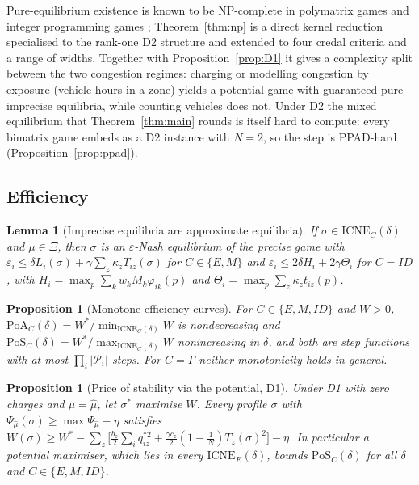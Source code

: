 \documentclass[preprint,12pt]{elsarticle}
\newtheorem{lemma}[theorem]{Lemma}
\newtheorem{proposition}[theorem]{Proposition}
\theoremstyle{definition}
\theoremstyle{remark}
\newcommand{\cP}{\mathcal{P}}
\newcommand{\ICNE}{\mathrm{ICNE}}
\begin{document}
Pure-equilibrium existence is known to be NP-complete in polymatrix games and integer programming games \citep{Apt2022,Carvalho2022}; Theorem~\ref{thm:np} is a direct kernel reduction specialised to the rank-one D2 structure and extended to four credal criteria and a range of widths. Together with Proposition~\ref{prop:D1} it gives a complexity split between the two congestion regimes: charging or modelling congestion by exposure (vehicle-hours in a zone) yields a potential game with guaranteed pure imprecise equilibria, while counting vehicles does not. Under D2 the mixed equilibrium that Theorem~\ref{thm:main} rounds is itself hard to compute: every bimatrix game embeds as a D2 instance with $N=2$, so the step is PPAD-hard \citep{Chen2009,Daskalakis2009} (Proposition~\ref{prop:ppad}).

\subsection{Efficiency}

\begin{lemma}[Imprecise equilibria are approximate equilibria]\label{lem:transfer}
If $\sigma\in\ICNE_C(\delta)$ and $\mu\in\Xi$, then $\sigma$ is an $\varepsilon$-Nash equilibrium of the precise game with $\varepsilon_i\le\delta L_i(\sigma)+\gamma\sum_z\kappa_zT_{iz}(\sigma)$ for $C\in\{E,M\}$ and $\varepsilon_i\le2\delta H_i+2\gamma\Theta_i$ for $C=ID$, with $H_i=\max_p\sum_kw_kM_k\varphi_{ik}(p)$ and $\Theta_i=\max_p\sum_z\kappa_zt_{iz}(p)$.
\end{lemma}

\begin{proposition}[Monotone efficiency curves]\label{prop:cs}
For $C\in\{E,M,ID\}$ and $W>0$, $\mathrm{PoA}_C(\delta)=W^*/\min_{\ICNE_C(\delta)}W$ is nondecreasing and $\mathrm{PoS}_C(\delta)=W^*/\max_{\ICNE_C(\delta)}W$ nonincreasing in $\delta$, and both are step functions with at most $\prod_i|\cP_i|$ steps. For $C=\Gamma$ neither monotonicity holds in general.
\end{proposition}

\begin{proposition}[Price of stability via the potential, D1]\label{prop:pos}
Under D1 with zero charges and $\mu=\hat\mu$, let $\sigma^*$ maximise $W$. Every profile $\sigma$ with $\Psi_{\hat\mu}(\sigma)\ge\max\Psi_{\hat\mu}-\eta$ satisfies
$W(\sigma)\ge W^*-\sum_z\big[\tfrac{b_z}{2}\sum_iq_{iz}^{*2}+\tfrac{\gamma c_z}{2}(1-\tfrac1N)T_z(\sigma)^2\big]-\eta$. In particular a potential maximiser, which lies in every $\ICNE_E(\delta)$, bounds $\mathrm{PoS}_C(\delta)$ for all $\delta$ and $C\in\{E,M,ID\}$.
\end{proposition}
\end{document}
